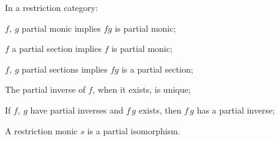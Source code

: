     \begin{lemma}
      \label{lem:rcs_partial_monic_section_inverse_properties}
      In a restriction category:
      \bproofenum
        \item $f,\ g$ partial monic implies $f g$ is partial monic;
        \item $f$ a partial section implies $f$ is partial monic;
        \item $f,\ g$ partial sections implies $f g$ is a partial section;
        \item The partial inverse of $f$, when it exists, is unique;
        \item If $f,\ g$ have partial inverses and $f\,g$ exists, then $f\,g$ has a partial inverse;
        \item A restriction monic $s$ is a partial isomorphism.
      \eproofenum
    \end{lemma}
